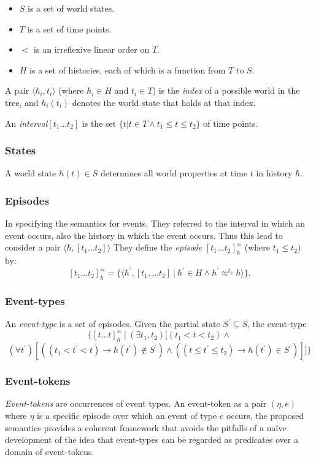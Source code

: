 \begin{itemize}
	\item $S$ is a set of world states.
	\item $T$ is a set of time points.
	\item $<$ is an irreflexive linear order on $T$.
	\item $H$ is a set of histories, each of which is a function from $T$ to $S$.
\end{itemize}

A pair $\langle \hbar_i, t_i \rangle$ (where $\hbar_i \in H$ and $t_i \in T$) is the \textit{index} of a possible world in the tree, and $h_i(t_i)$ denotes the world state that holds at that index.

An \textit{interval}$[t_1 \dots t_2]$ is the set $\{ t | t \in T \land t_1 \leq t \leq t_2\}$ of time points.


\subsubsection{States}
A world state $\hbar(t) \in S$ determines all world properties at time $t$ in history $\hbar$.

\subsubsection{Episodes}
In specifying the semantics for events, They referred to the interval in which an event occurs, also the history in which the event occurs.
Thus this lead to consider a pair $\langle \hbar, [t_1 \dots t_2] \rangle$
They define the \textit{episode} $[t_1 \dots t_2]_{\hbar}^{\approx}$ (where $t_1 \leq t_2$) by:
\[
	[t_1 \dots t_2]_{\hbar}^{\approx} = \{\langle \hbar^{\prime}, [t_1, \dots t_2] \ | \  \hbar^{\prime} \in H \land \hbar^{\prime} \approx^{t_2} \hbar \rangle\}.
\]

\subsubsection{Event-types}
An \textit{event-type} is a set of episodes. Given the partial state $S^{\prime} \subseteq S$, the event-type
\[
	\{
	[t \dots t]_{\hbar}^{\approx} \ | \ (\exists t_1, t_2) [
			(t_1 < t < t_2) \land
			\]
			\[
			(\forall t^{\prime})[
					((t_1 < t^{\prime} < t) \to \hbar(t^{\prime}) \not\in S^{\prime}) \land
					((t \leq t^{\prime} \leq t_2) \to \hbar(t^{\prime}) \in S^{\prime})
				]
		]
	\}
\]

\subsubsection{Event-tokens}
\textit{Event-tokens} are occurrences of event types.
An event-token as a pair $(\eta, e)$ where $\eta$ is a specific episode over which an event of type $e$ occurs, the proposed semantics provides a coherent framework that avoids the pitfalls of a naïve development of the idea that event-types can be regarded as predicates over a domain of event-tokens.

